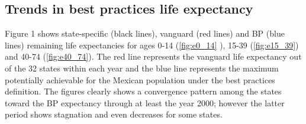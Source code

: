 \documentclass{article}
\begin{document}
\subsection*{Trends in best practices life expectancy}

Figure 1 shows state-specific  (black lines), vanguard  (red lines) and BP (blue
lines) remaining life expectancies for ages 0-14 (\ref{fig:e0_14} ), 15-39
(\ref{fig:e15_39}) and 40-74 (\ref{fig:e40_74}). The red line represents the
vanguard life expectancy out of the 32 states within each year and the blue line
represents the maximum potentially achievable for the Mexican population under
the best practices definition.
The figures clearly shows a convergence pattern among the states toward the BP
expectancy through at least the year 2000; however the latter period shows
stagnation and even decreases for some states.
\end{document}
